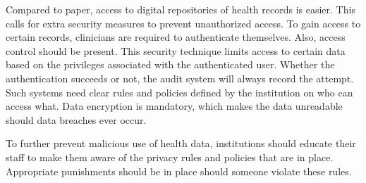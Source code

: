     Compared to paper, access to digital repositories of health records is easier. This calls for extra security measures to prevent unauthorized access. To gain access to certain records, clinicians are required to authenticate themselves. Also, access control should be present. This security technique limits access to certain data based on the privileges associated with the authenticated user. Whether the authentication succeeds or not, the audit system will always record the attempt. Such systems need clear rules and policies defined by the institution on who can access what. Data encryption is mandatory, which makes the data unreadable should data breaches ever occur.

    To further prevent malicious use of health data, institutions should educate their staff to make them aware of the privacy rules and policies that are in place. Appropriate punishments should be in place should someone violate these rules.